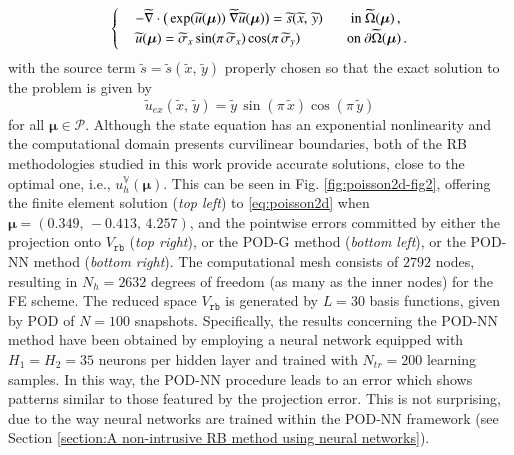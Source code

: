 \documentclass[longtitle]{elsarticle}
\numberwithin{equation}{section}
\theoremstyle{theorem}
\theoremstyle{definition}
\theoremstyle{remark}
\theoremstyle{proposition}
\numberwithin{figure}{section}
\newcommand{\wt}[1]{\widetilde{#1}}
\newcommand{\bg}[1]{\boldsymbol{#1}}
\begin{document}
		\begin{equation}
			\label{eq:poisson2d}
			\begin{cases}
				& - \wt{\nabla} \cdot \big( \exp(\wt{u}(\bg{\mu})) ~ \wt{\nabla} \wt{u}(\bg{\mu}) \big) = \wt{s}(\wt{x}, \, \wt{y}) \hspace*{20pt} \text{in $\wt{\Omega}(\bg{\mu})$} \, , \\
				& \wt{u}(\bg{\mu}) = \wt{\sigma}_x \sin(\pi \, \wt{\sigma}_x) \cos(\pi \, \wt{\sigma}_y) \hspace*{33.5pt} \text{on $\partial \wt{\Omega}(\bg{\mu})$} \, .
			\end{cases}
		\end{equation}
		with the source term $\wt{s} = \wt{s}(\wt{x}, \, \wt{y})$ properly chosen so that the exact solution to the problem is given by \[ \wt{u}_{ex}(\wt{x}, \, \wt{y}) = \wt{y} \, \sin(\pi \, \wt{x}) \cos(\pi \, \wt{y}) \] for all $\bg{\mu} \in \mathcal{P}$. Although the state equation has an exponential nonlinearity and the computational domain presents curvilinear boundaries, both of the RB methodologies studied in this work provide accurate solutions, close to the optimal one, i.e., $u_h^{\mathbb{V}}(\bg{\mu})$.	This can be seen in Fig. \ref{fig:poisson2d-fig2}, offering the finite element solution (\emph{top left}) to \eqref{eq:poisson2d} when $\bg{\mu} = (0.349, \, -0.413, \, 4.257)$, and the pointwise errors committed by either the projection onto $V_{\texttt{rb}}$ (\emph{top right}), or the POD-G method (\emph{bottom left}), or the POD-NN method (\emph{bottom right}). The computational mesh consists of $2792$ nodes, resulting in $N_h = 2632$ degrees of freedom (as many as the inner nodes) for the FE scheme. The reduced space $V_{\texttt{rb}}$ is generated by $L = 30$ basis functions, given by POD of $N = 100$ snapshots. Specifically, the results concerning the POD-NN method have been obtained by employing a neural network equipped with $H_1 = H_2 = 35$ neurons per hidden layer and trained with $N_{tr} = 200$ learning samples. In this way, the POD-NN procedure leads to an error which shows patterns similar to those featured by the projection error. This is not surprising, due to the way neural networks are trained within the POD-NN framework (see Section \ref{section:A non-intrusive RB method using neural networks}). 
		
\end{document}
